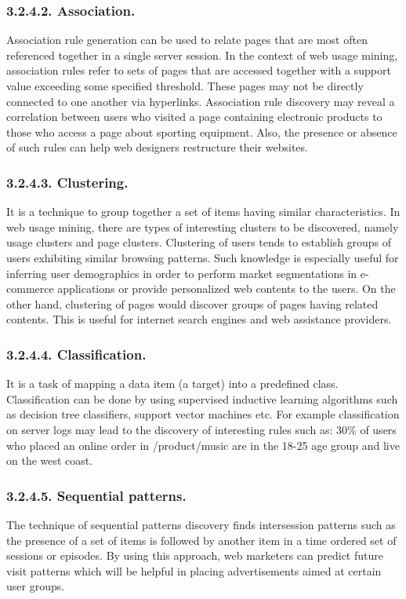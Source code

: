 \documentclass{article}
\begin{document}
\subsubsection*{3.2.4.2. Association.} 
Association rule generation can be used to relate pages that are most often referenced together in a single server session. In the context of web usage mining, association rules refer to sets of pages that are accessed together with a support value exceeding some specified threshold. These pages may not be directly connected to one another via hyperlinks. Association rule discovery may reveal a correlation between users who visited a page containing electronic products to those who access a page about sporting equipment. Also, the presence or absence of such rules can help web designers restructure their websites.

\subsubsection*{3.2.4.3. Clustering.}
It is a technique to group together a set of items having similar characteristics. In web usage mining, there are types of interesting clusters to be discovered, namely usage clusters and page clusters. Clustering of users tends to establish groups of users exhibiting similar browsing patterns. Such knowledge is especially useful for inferring user demographics in order to perform market segmentations in e-commerce applications or provide personalized web contents to the users. On the other hand, clustering of pages would discover groups of pages having related contents. This is useful for internet search engines and web assistance providers.
\subsubsection*{3.2.4.4. Classification.} 
It is a task of mapping a data item (a target) into a  predefined class. Classification can be done by using supervised inductive learning algorithms such as decision tree classifiers, support vector machines etc. For example classification on server logs may lead to the discovery of interesting rules such as: 30\% of users who placed an online order in /product/music are in the 18-25 age group and live on the west coast.
\subsubsection*{3.2.4.5. Sequential patterns.}
 The technique of sequential patterns discovery finds intersession patterns such as the presence of a set of items is followed by another item in a time ordered set of sessions or episodes. By using this approach, web marketers can predict future visit patterns which will be helpful in placing advertisements aimed at certain user groups.
\end{document}

